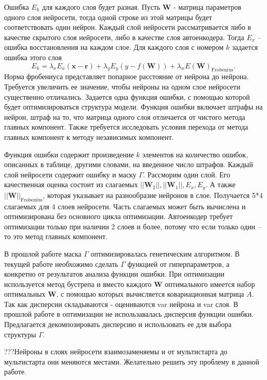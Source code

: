 \documentclass[12pt, twoside]{article}
\newcommand{\xb}{{\mathbf{x}}}
\newenvironment{comment}{}{}
\newcommand{\w}{{\mathbf{W}}}
\begin{document}
\begin{comment}
Ошибка $E_k$ для каждого слоя будет разная. Пусть $\w$ - матрица параметров одного слоя нейросети, тогда одной строке из этой матрицы будет соответствовать один нейрон. Каждый слой нейросети рассматривается либо в качестве скрытого слоя нейросети, либо в качестве слоя автоенкодера. Тогда $E_x$ – ошибка восстановления на каждом слое. Для каждого слоя с номером $k$ задается ошибка этого слоя
\begin{equation}\label{eq4}
E_k = \lambda_xE_x(\xb-\mathbf{r})+\lambda_yE_y(y-f(\w)) +\lambda_wE(\w)_\text{Frobenius}. 
\end{equation}
Норма фробениуса представляет попарное расстояние от нейрона до нейрона. Требуется увеличить ее значение, чтобы нейроны на одном слое нейросети существенно отличались. Задается одна функция ошибки, с помощью которой будет оптимизироваться структура модели.
Функция ошибки включает штрафы на нейрон, штраф на то, что матрица одного слоя отличается от чистого метода главных компонент. Также требуется исследовать условия перехода от метода главных компонент к методу независимых компонент.

Функция ошибки содержит произведение $k$ элементов на количество ошибок, описанных в таблице, другими словами, на введенное число штрафов. Каждый слой нейросети содержит ошибку и маску $\Gamma$.
Рассморим один слой. Его качественная оценка состоит из слагаемых $||\w_2||, ||\w_1||, E_x, E_y$. А также $||\w||_{\text{Frobenius}}$, которая указывает на разнообразие нейронов в слое. Получается 5*4 слагаемых для 4 слоев нейросети. 
Часть слагаемых может быть вычислена и оптимизирована без основного цикла оптимизации. Автоенкодер требует оптимизации только при наличии 2 слоев и более, потому что если только один – то это метод главных компонент. 

В прошлой работе маска $\Gamma$ оптимизировалась генетическим алгоритмом. В текущей работе необхожимо сделать $\Gamma$ функцией от гиперпараметров, а конкретно от результатов анализа функции ошибки.
При оптимизации используется метод бустрепа и вместо каждого $\w$ оптимального имеется набор оптимальных $\w$, с помощью которых вычисляется ковариационная матрица $A$. Так как дисперсии складываются -  оцениваются var нейрона и var слоя. В прошлой работе в оптимизации не использавалась дисперсия функции ошибки.
Предлагается декомпозировать дисперсию и использовать ее для выбора структуры $\Gamma$. 


???Нейроны в слоях нейросети взаимозаменяемы и
от мультистарта до мультистарта они меняются местами. Желательно решить эту проблему в данной работе. 


\end{comment}
\end{document}
